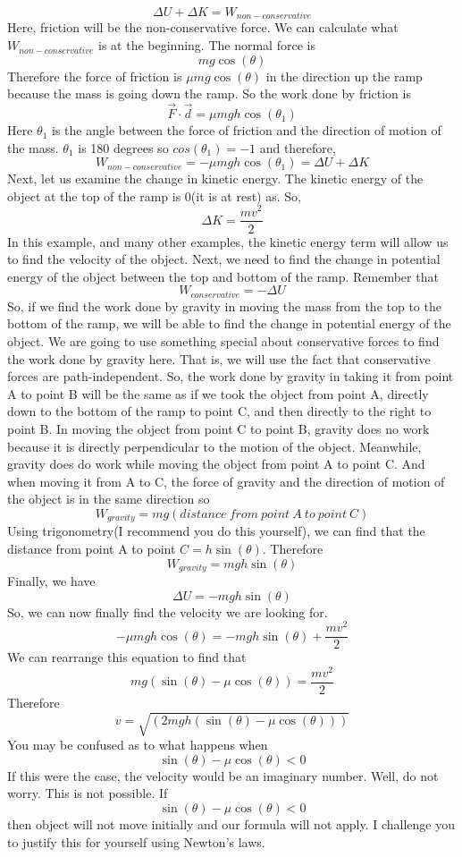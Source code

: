 $$\Delta U+\Delta K=W_{non-conservative}$$ Here, friction will be the non-conservative force. We can calculate what $W_{non-conservative}$ is at the beginning. The normal force is $$mg\cos\left(\theta \right)$$ Therefore the force of friction is $\mu mg\cos\left(\theta \right)$ in the direction up the ramp because the mass is going down the ramp. So the work done by friction is $$\vec{F} \cdot \vec{d}=\mu mgh\cos\left(\theta_1 \right)$$ Here $\theta_1$ is the angle between the force of friction and the direction of motion of the mass. $\theta_1$ is 180 degrees so $cos\left(\theta_1 \right)=-1$ and therefore,  $$W_{non-conservative}=-\mu mgh\cos\left(\theta_1 \right)=\Delta U+\Delta K$$ Next, let us examine the change in kinetic energy. The kinetic energy of the object at the top of the ramp is 0(it is at rest) as. So, $$\Delta K=\frac{mv^2}{2}$$ In this example, and many other examples, the kinetic energy term will allow us to find the velocity of the object. Next, we need to find the change in potential energy of the object between the top and bottom of the ramp. Remember that $$W_{conservative}=-\Delta U$$ So, if we find the work done by gravity in moving the mass from the top to the bottom of the ramp, we will be able to find the change in potential energy of the object. We are going to use something special about conservative forces to find the work done by gravity here. That is, we will use the fact that conservative forces are path-independent. So, the work done by gravity in taking it from point A to point B will be the same as if we took the object from point A, directly down to the bottom of the ramp to point C, and then directly to the right to point B. In moving the object from point C to point B, gravity does no work because it is directly perpendicular to the motion of the object. Meanwhile, gravity does do work while moving the object from point A to point C. And when moving it from A to C, the force of gravity and the direction of motion of the object is in the same direction so $$W_{gravity}=mg\left(distance\ from\ point\ A\ to\ point\ C \right)$$ Using trigonometry(I recommend you do this yourself), we can find that the distance from point A to point $C=h\sin\left(\theta \right)$. Therefore \begin{equation}W_{gravity}=mgh\sin\left(\theta \right)\end{equation} Finally, we have \begin{equation}\Delta U=-mgh\sin\left(\theta \right)\end{equation} So, we can now finally find the velocity we are looking for. $$-\mu mgh\cos\left(\theta \right)=-mgh\sin\left(\theta \right)+\frac{mv^2}{2}$$ We can rearrange this equation to find that $$mg\left(\sin\left(\theta \right )-\mu \cos\left(\theta \right)\right)=\frac{mv^2}{2}$$ Therefore \begin{equation}v=\sqrt{\left(2mgh\left(\sin\left(\theta \right)-\mu \cos\left(\theta \right)\right)\right)}\end{equation} You may be confused as to what happens when $$\sin\left(\theta \right)-\mu \cos\left(\theta \right) < 0$$ If this were the case, the velocity would be an imaginary number. Well, do not worry. This is not possible. If $$\sin\left(\theta \right)-\mu \cos \left(\theta \right) < 0$$ then object will not move initially and our formula will not apply. I challenge you to justify this for yourself using Newton’s laws. 